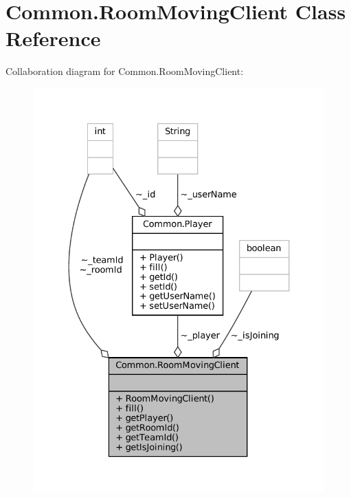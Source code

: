 \hypertarget{classCommon_1_1RoomMovingClient}{}\section{Common.\+Room\+Moving\+Client Class Reference}
\label{classCommon_1_1RoomMovingClient}


Collaboration diagram for Common.\+Room\+Moving\+Client\+:
\nopagebreak
\begin{figure}[H]
\begin{center}
\leavevmode
\includegraphics[width=330pt]{classCommon_1_1RoomMovingClient__coll__graph}
\end{center}
\end{figure}
